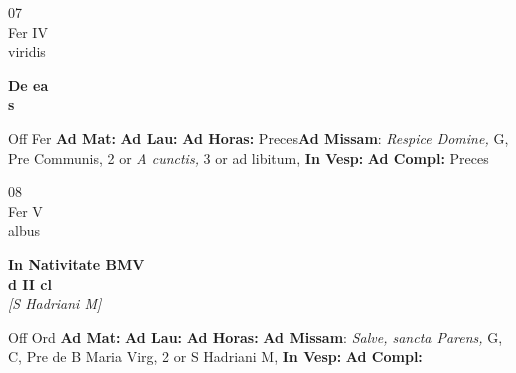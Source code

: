 \documentclass[10pt, openany]{book}
\begin{document}
        \begin{center}
            \begin{minipage}{3.5in}
                \vspace{2em}
                \begin{minipage}{0.5in}
                    {\Huge 07} \\
                    {\normalsize Fer IV} \\
                    {\normalsize viridis}
                \end{minipage}
                \begin{minipage}{3.0in}
                    \textbf{ \large De ea \\
                    \textnormal{\normalsize s}} \\ 
                \end{minipage}
                \begin{justify}Off Fer
                    \textbf{Ad Mat: }
                    \textbf{Ad Lau: }
                    \textbf{Ad Horas: }Preces\textbf{Ad Missam}: \textit{Respice Domine,} G, Pre Communis, 2 or \textit{A cunctis,} 3 or ad libitum,  
                    \textbf{In Vesp: }
                    \textbf{Ad Compl: }Preces
                \end{justify}
            \end{minipage}
        \end{center}
    
        \begin{center}
            \begin{minipage}{3.5in}
                \vspace{2em}
                \begin{minipage}{0.5in}
                    {\Huge 08} \\
                    {\normalsize Fer V} \\
                    {\normalsize albus}
                \end{minipage}
                \begin{minipage}{3.0in}
                    \textbf{ \large In Nativitate BMV \\
                    \textnormal{\normalsize d II cl}} \\ \textit{[S Hadriani M]} \\ 
                \end{minipage}
                \begin{justify}Off Ord
                    \textbf{Ad Mat: }
                    \textbf{Ad Lau: }
                    \textbf{Ad Horas: }\textbf{Ad Missam}: \textit{Salve, sancta Parens,} G, C, Pre de B Maria Virg, 2 or S Hadriani M,  
                    \textbf{In Vesp: }
                    \textbf{Ad Compl: }
                \end{justify}
            \end{minipage}
        \end{center}
    
\end{document}
